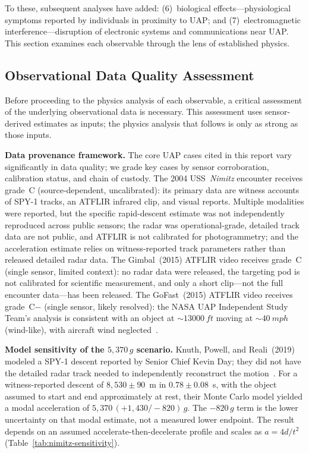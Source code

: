\documentclass[aps,prd,twocolumn,superscriptaddress,nofootinbib,floatfix]{revtex4-2}
\begin{document}
To these, subsequent analyses have added: (6)~biological effects---physiological
symptoms reported by individuals in proximity to UAP; and
(7)~electromagnetic interference---disruption of electronic systems and
communications near UAP. This section examines each observable through the lens
of established physics.

\subsection{Observational Data Quality Assessment}\label{sec:data-quality}

Before proceeding to the physics analysis of each observable, a critical assessment
of the underlying observational data is necessary. This assessment uses
sensor-derived estimates as inputs; the physics analysis that follows is only as
strong as those inputs.

\textbf{Data provenance framework.} The core UAP cases cited in this report vary
significantly in data quality; we grade key cases by sensor corroboration,
calibration status, and chain of custody. The 2004 USS~\textit{Nimitz} encounter
receives grade~C (source-dependent, uncalibrated): its primary data are witness
accounts of SPY-1 tracks, an ATFLIR infrared clip, and visual reports. Multiple
modalities were reported, but the specific rapid-descent estimate was not
independently reproduced across public sensors; the radar was operational-grade,
detailed track data are not public, and ATFLIR is not calibrated for
photogrammetry; and the acceleration estimate relies on witness-reported track
parameters rather than released detailed radar data. The Gimbal~(2015) ATFLIR
video receives grade~C (single sensor, limited context): no radar data were
released, the targeting pod is not calibrated for scientific measurement, and only
a short clip---not the full encounter data---has been released. The GoFast~(2015)
ATFLIR video receives grade~C$-$ (single sensor, likely resolved): the NASA UAP
Independent Study Team's analysis is consistent with an object at
${\sim}\SI{13000}{ft}$ moving at ${\sim}\SI{40}{mph}$ (wind-like), with aircraft
wind neglected~\cite{NASA_UAP2023}.

\textbf{Model sensitivity of the $5{,}370\,g$ scenario.} Knuth, Powell, and
Reali~(2019) modeled a SPY-1 descent reported by Senior Chief Kevin Day; they did
not have the detailed radar track needed to independently reconstruct the
motion~\cite{Knuth2019}. For a witness-reported descent of $8{,}530\pm90$~m in
$0.78\pm0.08$~s, with the object assumed to start and end approximately at rest,
their Monte Carlo model yielded a modal acceleration of
$5{,}370\,(+1{,}430/{-}820)\,g$. The ${-}820\,g$ term is the lower uncertainty on
that modal estimate, not a measured lower endpoint. The result depends on an
assumed accelerate-then-decelerate profile and scales as $a=4d/t^{2}$
(Table~\ref{tab:nimitz-sensitivity}).
\end{document}
